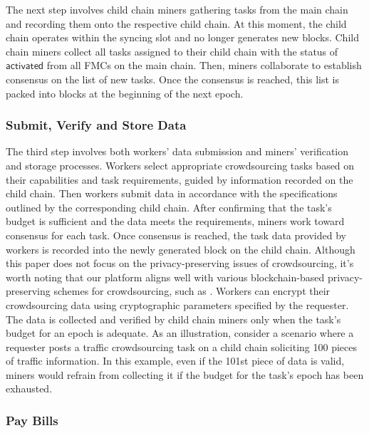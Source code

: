 \documentclass[10pt,journal]{IEEEtran}
\begin{document}
The next step involves child chain miners gathering tasks from the main chain and recording them onto the respective child chain. At this moment, the child chain operates within the syncing slot and no longer generates new blocks. Child chain miners collect all tasks assigned to their child chain with the status of $\mathsf{activated}$ from all FMCs on the main chain. Then, miners collaborate to establish consensus on the list of new tasks. Once the consensus is reached, this list is packed into blocks at the beginning of the next epoch.

\subsubsection{\textbf{Submit, Verify and Store Data}}

The third step involves both workers' data submission and miners' verification and storage processes. Workers select appropriate crowdsourcing tasks based on their capabilities and task requirements, guided by information recorded on the child chain. Then workers submit data in accordance with the specifications outlined by the corresponding child chain. After confirming that the task's budget is sufficient and the data meets the requirements, miners work toward consensus for each task. Once consensus is reached, the task data provided by workers is recorded into the newly generated block on the child chain. Although this paper does not focus on the privacy-preserving issues of crowdsourcing, it's worth noting that our platform aligns well with various blockchain-based privacy-preserving schemes for crowdsourcing, such as \cite{wang2022triple,cai2019towards,koutsos2021agora}. Workers can encrypt their crowdsourcing data using cryptographic parameters specified by the requester. The data is collected and verified by child chain miners only when the task's budget for an epoch is adequate. As an illustration, consider a scenario where a requester posts a traffic crowdsourcing task on a child chain soliciting 100 pieces of traffic information. In this example, even if the 101st piece of data is valid, miners would refrain from collecting it if the budget for the task's epoch has been exhausted.

\subsubsection{\textbf{Pay Bills}}\label{pay_bills}
\end{document}
